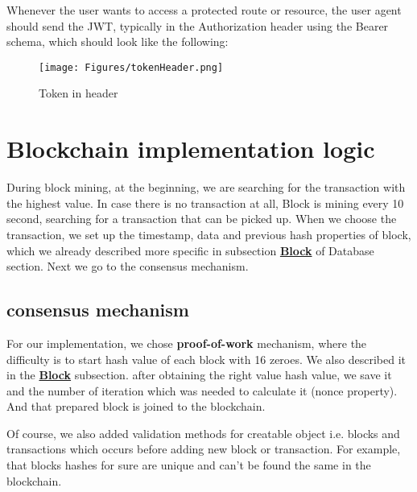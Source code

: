 \documentclass[
	letterpaper, %
	10pt, %
]{CSUniSchoolLabReport}
\begin{document}
Whenever the user wants to access a protected route or resource, the user agent should send the JWT, typically in the Authorization header using the Bearer schema, which should look like the following:

\begin{figure}[hbt!]
    \centering
    \texttt{[image: Figures/tokenHeader.png]}
    \caption{Token in header}
\end{figure}

\newpage
\section{Blockchain implementation logic}
During block mining, at the beginning, we are searching for the transaction with the highest value. In case there is no transaction at all, Block is mining every 10 second, searching for a transaction that can be picked up. When we choose the transaction, we set up the timestamp, data and previous hash properties of block, which we already described more specific in subsection \hyperref[subsec:blockdesc]{\textbf{Block}} of Database section. Next we go to the consensus mechanism.

\subsection{consensus mechanism}
For our implementation, we chose \textbf{proof-of-work} mechanism, where the difficulty is to start hash value of each block with 16 zeroes. We also described it in the \hyperref[subsec:blockdesc]{\textbf{Block}} subsection. after obtaining the right value hash value, we save it and the number of iteration which was needed to calculate it (nonce property).
And that prepared block is joined to the blockchain.

Of course, we also added validation methods for creatable object i.e. blocks and transactions which occurs before adding new block or transaction. For example, that blocks hashes for sure are unique and can't be found the same in the blockchain.
\end{document}
